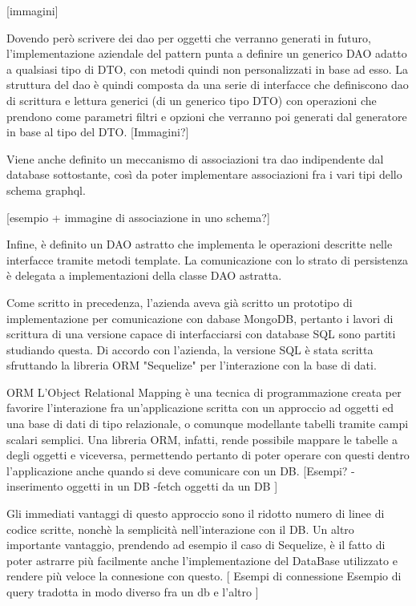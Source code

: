         [immagini]

        Dovendo però scrivere dei dao per oggetti che verranno generati in futuro, l'implementazione aziendale del pattern punta a definire un generico DAO adatto a qualsiasi tipo di DTO, con metodi quindi non personalizzati in base ad esso.
        La struttura del dao è quindi composta da una serie di interfacce che definiscono dao di scrittura e lettura generici (di un generico tipo DTO) con operazioni che prendono come parametri filtri e opzioni che verranno poi generati dal generatore in base al tipo del DTO.
        [Immagini?]
        
        Viene anche definito un meccanismo di associazioni tra dao indipendente dal database sottostante, così da poter implementare associazioni fra i vari tipi dello schema graphql.

        [esempio + immagine di associazione in uno schema?]

        Infine, è definito un DAO astratto che implementa le operazioni descritte nelle interfacce tramite metodi template.
        La comunicazione con lo strato di persistenza è delegata a implementazioni della classe DAO astratta.

        Come scritto in precedenza, l'azienda aveva già scritto un prototipo di implementazione per comunicazione con dabase MongoDB, pertanto i lavori di scrittura di una versione capace di interfacciarsi con database SQL sono partiti studiando questa.
        Di accordo con l'azienda, la versione SQL è stata scritta sfruttando la libreria ORM "Sequelize" per l'interazione con la base di dati.
    
    ORM
        L'Object Relational Mapping è una tecnica di programmazione creata per favorire l'interazione fra un'applicazione scritta con un approccio ad oggetti ed una base di dati di tipo relazionale, o comunque modellante tabelli tramite campi scalari semplici.
        Una libreria ORM, infatti, rende possibile mappare le tabelle a degli oggetti e viceversa, permettendo pertanto di poter operare con questi dentro l'applicazione anche quando si deve comunicare con un DB.
        [Esempi?
            -inserimento oggetti in un DB
            -fetch oggetti da un DB
        ]

        Gli immediati vantaggi di questo approccio sono il ridotto numero di linee di codice scritte, nonchè la semplicità nell'interazione con il DB.
        Un altro importante vantaggio, prendendo ad esempio il caso di Sequelize, è il fatto di poter astrarre più facilmente anche l'implementazione del DataBase utilizzato e rendere più veloce la connesione con questo.
        [
            Esempi di connessione
            Esempio di query tradotta in modo diverso fra un db e l'altro
        ]


